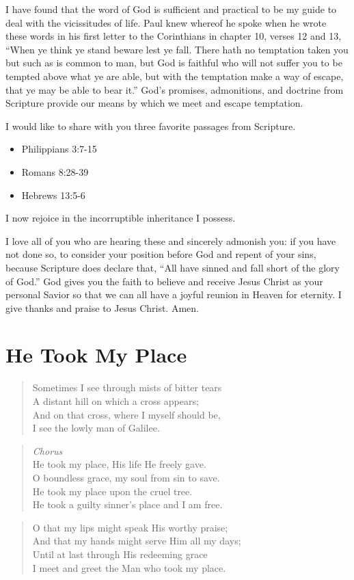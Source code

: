 \documentclass{article}
\begin{document}
I have found that the word of God is sufficient and practical 
    to be my guide to deal with the vicissitudes of life.
Paul knew whereof he spoke when he wrote these words 
    in his first letter to the Corinthians in chapter 10, verses 12 and 13,
    ``When ye think ye stand beware lest ye fall.
    There hath no temptation taken you but such as is common to man,
    but God is faithful who will not suffer you to be tempted
    above what ye are able,
    but with the temptation make a way of escape,
    that ye may be able to bear it.''
God's promises, admonitions, and doctrine from Scripture provide our means
    by which we meet and escape temptation.

I would like to share with you three favorite passages from Scripture.
\begin{itemize}
\item Philippians 3:7-15
\item Romans 8:28-39
\item Hebrews 13:5-6
\end{itemize}
I now rejoice in the incorruptible inheritance I possess.

I love all of you who are hearing these and sincerely admonish you:
    if you have not done so,
    to consider your position before God and repent of your sins,
    because Scripture does declare that,
    ``All have sinned and fall short of the glory of God.''
God gives you the faith to believe and receive Jesus Christ 
    as your personal Savior 
    so that we can all have a joyful reunion in Heaven for eternity.
I give thanks and praise to Jesus Christ. 
Amen.

\section{He Took My Place}

\begin{verse}
Sometimes I see through mists of bitter tears \\
A distant hill on which a cross appears; \\
And on that cross, where I myself should be, \\
I see the lowly man of Galilee.
\end{verse}

\begin{verse}
\emph{Chorus} \\
He took my place, His life He freely gave. \\
O boundless grace, my soul from sin to save. \\
He took my place upon the cruel tree. \\
He took a guilty sinner's place and I am free.
\end{verse}

\begin{verse}
O that my lips might speak His worthy praise; \\
And that my hands might serve Him all my days; \\
Until at last through His redeeming grace \\
I meet and greet the Man who took my place.
\end{verse}
\end{document}
